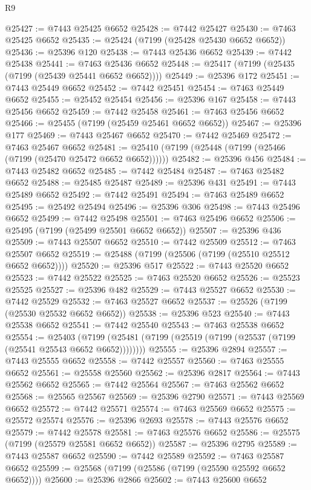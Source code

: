 \begin{lexlean}{R9}
\begin{coremodule}
{{{{{{{{{{{{{{{{{{{{{{{{{{{{{{{{{{{{{{{{{{{{{{{{{{{{{{{{{{{{{{{{{{{{{{{{{{{{{{{{{{{{@25427 := @7443 @25425 @6652
@25428 := @7442 @25427
@25430 := @7463 @25425 @6652
@25435 := @25424 (@7199 (@25428 @25430 @6652 @6652))
@25436 := @25396 @120
@25438 := @7443 @25436 @6652
@25439 := @7442 @25438
@25441 := @7463 @25436 @6652
@25448 := @25417 (@7199 (@25435 (@7199 (@25439 @25441 @6652 @6652))))
@25449 := @25396 @172
@25451 := @7443 @25449 @6652
@25452 := @7442 @25451
@25454 := @7463 @25449 @6652
@25455 := @25452 @25454
@25456 := @25396 @167
@25458 := @7443 @25456 @6652
@25459 := @7442 @25458
@25461 := @7463 @25456 @6652
@25466 := @25455 (@7199 (@25459 @25461 @6652 @6652))
@25467 := @25396 @177
@25469 := @7443 @25467 @6652
@25470 := @7442 @25469
@25472 := @7463 @25467 @6652
@25481 := @25410 (@7199 (@25448 (@7199 (@25466 (@7199 (@25470 @25472 @6652 @6652))))))
@25482 := @25396 @456
@25484 := @7443 @25482 @6652
@25485 := @7442 @25484
@25487 := @7463 @25482 @6652
@25488 := @25485 @25487
@25489 := @25396 @431
@25491 := @7443 @25489 @6652
@25492 := @7442 @25491
@25494 := @7463 @25489 @6652
@25495 := @25492 @25494
@25496 := @25396 @306
@25498 := @7443 @25496 @6652
@25499 := @7442 @25498
@25501 := @7463 @25496 @6652
@25506 := @25495 (@7199 (@25499 @25501 @6652 @6652))
@25507 := @25396 @436
@25509 := @7443 @25507 @6652
@25510 := @7442 @25509
@25512 := @7463 @25507 @6652
@25519 := @25488 (@7199 (@25506 (@7199 (@25510 @25512 @6652 @6652))))
@25520 := @25396 @517
@25522 := @7443 @25520 @6652
@25523 := @7442 @25522
@25525 := @7463 @25520 @6652
@25526 := @25523 @25525
@25527 := @25396 @482
@25529 := @7443 @25527 @6652
@25530 := @7442 @25529
@25532 := @7463 @25527 @6652
@25537 := @25526 (@7199 (@25530 @25532 @6652 @6652))
@25538 := @25396 @523
@25540 := @7443 @25538 @6652
@25541 := @7442 @25540
@25543 := @7463 @25538 @6652
@25554 := @25403
    (@7199 (@25481 (@7199 (@25519 (@7199 (@25537 (@7199 (@25541 @25543 @6652 @6652))))))))
@25555 := @25396 @2894
@25557 := @7443 @25555 @6652
@25558 := @7442 @25557
@25560 := @7463 @25555 @6652
@25561 := @25558 @25560
@25562 := @25396 @2817
@25564 := @7443 @25562 @6652
@25565 := @7442 @25564
@25567 := @7463 @25562 @6652
@25568 := @25565 @25567
@25569 := @25396 @2790
@25571 := @7443 @25569 @6652
@25572 := @7442 @25571
@25574 := @7463 @25569 @6652
@25575 := @25572 @25574
@25576 := @25396 @2693
@25578 := @7443 @25576 @6652
@25579 := @7442 @25578
@25581 := @7463 @25576 @6652
@25586 := @25575 (@7199 (@25579 @25581 @6652 @6652))
@25587 := @25396 @2795
@25589 := @7443 @25587 @6652
@25590 := @7442 @25589
@25592 := @7463 @25587 @6652
@25599 := @25568 (@7199 (@25586 (@7199 (@25590 @25592 @6652 @6652))))
@25600 := @25396 @2866
@25602 := @7443 @25600 @6652
}}}}}}}}}}}}}}}}}}}}}}}}}}}}}}}}}}}}}}}}}}}}}}}}}}}}}}}}}}}}}}}}}}}}}}}}}}}}}}}}}}}}
\end{coremodule}
\end{lexlean}
